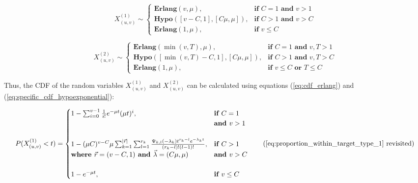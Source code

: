 \begin{equation}
    X_{(u,v)}^{(1)} \sim 
    \begin{cases}
        \textbf{Erlang}(v, \mu), & \textbf{if } C = 1 \textbf{ and } v>1 \\
        \textbf{Hypo} \left(
            \left[v - C, 1\right], \left[C \mu, \mu \right]
        \right), & \textbf{if } C > 1 \textbf{ and } v>C \\
        \textbf{Erlang}(1, \mu), & \textbf{if } v \leq C
    \end{cases}
\end{equation}

\begin{equation}
    X_{(u,v)}^{(2)} \sim 
    \begin{cases}
        \textbf{Erlang}(\min(v, T), \mu), & \textbf{if } C = 1
            \textbf{ and } v, T > 1 \\
        \textbf{Hypo}\left(
            \left[ \min(v, T) - C, 1 \right], \left[ C \mu, \mu \right]
        \right), & \textbf{if } C > 1 \textbf{ and } v, T  > C \\
        \textbf{Erlang}(1, \mu), & \textbf{if } v \leq C \textbf{ or } T \leq C
    \end{cases}
\end{equation}


Thus, the CDF of the random variables \(X_{(u,v)}^{(1)}\) and 
\(X_{(u,v)}^{(2)}\) can be calculated using equations (\ref{eq:cdf_erlang}) and 
(\ref{eq:specific_cdf_hypoexponential}):

\begin{equation}
    P(X_{(u,v)}^{(1)} < t) = 
    \begin{cases}
        1 - \sum_{i=0}^{v-1} \frac{1}{i!} e^{-\mu t} (\mu t)^i, 
            & \textbf{if } C = 1 \\
            & \textbf{and } v>1 \\
        & \\
        1 - (\mu C)^{v-C} \mu  
            \sum_{k=1}^{\mid \vec{r} \mid} \sum_{l=1}^{r_k}
            \frac{\Psi_{k,l}(-\lambda_k)t^{r_k - l} 
            e^{-\lambda_k t}}{(r_k - l)! (l - 1)!},
            & \textbf{if } C > 1 \\
        \textbf{where } \vec{r}=(v - C, 1) \textbf{ and } 
            \vec{\lambda}=(C \mu, \mu) & \textbf{and } v > C \\
        & \\
        1 - e^{-\mu t},  & \textbf{if } v \leq C
    \end{cases}
    \tag{\ref{eq:proportion_within_target_type_1} revisited}
\end{equation}


